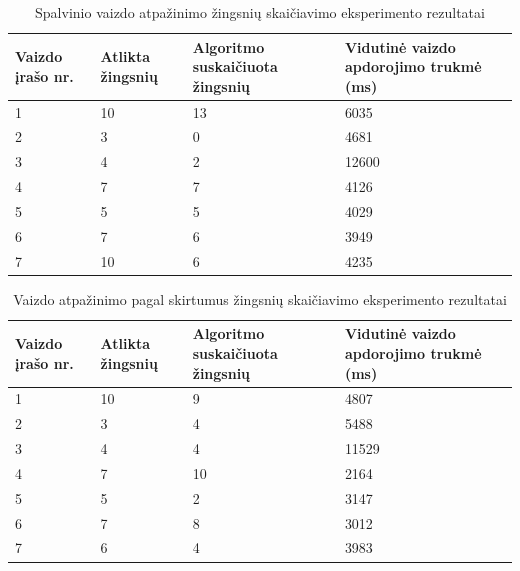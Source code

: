 \documentclass{VUMIFPSbakalaurinis}
\begin{document}
\begin{table}[H]\footnotesize
	\centering
	\caption{Spalvinio vaizdo atpažinimo žingsnių skaičiavimo eksperimento rezultatai}
	{\begin{tabular}{|p{3cm}|p{3cm}|p{3cm}|p{3cm}|} \hline
			\textbf{Vaizdo įrašo nr.} & \textbf{Atlikta žingsnių} & \textbf{Algoritmo suskaičiuota žingsnių} & \textbf{Vidutinė vaizdo apdorojimo trukmė (ms)} \\
			\hline
			1  & 10    & 13    & 6035    \\
			\hline
			2  & 3    & 0  & 4681     \\
			\hline
			3  & 4    & 2   & 12600    \\
			\hline
			4  & 7    & 7  & 4126     \\
			\hline
			5  & 5    & 5  & 4029     \\
			\hline
			6  & 7    & 6  & 3949     \\
			\hline
			7  & 10    & 6  & 4235     \\
			\hline
	\end{tabular}}
	\label{tab:colorresults}
\end{table}

\begin{table}[H]\footnotesize
	\centering
	\caption{Vaizdo atpažinimo pagal skirtumus žingsnių skaičiavimo eksperimento rezultatai}
	{\begin{tabular}{|p{3cm}|p{3cm}|p{3cm}|p{3cm}|} \hline
			\textbf{Vaizdo įrašo nr.} & \textbf{Atlikta žingsnių} & \textbf{Algoritmo suskaičiuota žingsnių} & \textbf{Vidutinė vaizdo apdorojimo trukmė (ms)} \\
			\hline
			1  & 10    & 9    & 4807    \\
			\hline
			2  & 3    & 4  & 5488     \\
			\hline
			3  & 4    & 4   & 11529    \\
			\hline
			4  & 7    & 10  & 2164     \\
			\hline
			5  & 5    & 2  & 3147     \\
			\hline
			6  & 7    & 8  & 3012     \\
			\hline
			7  & 6    & 4  & 3983     \\
			\hline
	\end{tabular}}
	\label{tab:diffresults}
\end{table}
\end{document}
